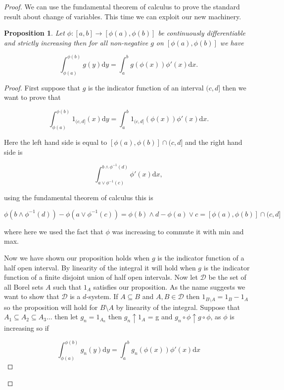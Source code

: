 \documentclass[
]{book}
\newtheorem{proposition}{Proposition}[chapter]
\theoremstyle{definition}
\theoremstyle{definition}
\theoremstyle{definition}
\theoremstyle{definition}
\theoremstyle{remark}
\begin{document}
\begin{proof}
We can use the fundamental theorem of calculus to prove the standard result about change of variables. This time we can exploit our new machinery.

\begin{proposition}
Let \(\phi: [a,b] \rightarrow [\phi(a), \phi(b)]\) be continuously differentiable and strictly increasing then for all non-negative \(g\) on \([\phi(a), \phi(b)]\) we have

\[ \int_{\phi(a)}^{\phi(b)}g(y) \mathrm{d}y = \int_a^b g(\phi(x)) \phi'(x) \mathrm{d}x. \]
\end{proposition}

\begin{proof}
First suppose that \(g\) is the indicator function of an interval \((c,d]\) then we want to prove that

\[ \int_{\phi(a)}^{\phi(b)} 1_{(c,d]}(x) \mathrm{d}y = \int_a^b  1_{(c,d]}(\phi(x)) \phi'(x) \mathrm{d}x.\]

Here the left hand side is equal to \([\phi(a), \phi(b)] \cap (c,d]\) and the right hand side is

\[ \int_{a \vee \phi^{-1}(c)}^{b \wedge \phi^{-1}(d)} \phi'(x) \mathrm{d}x,\]

using the fundamental theorem of calculus this is

\[ \phi(b \wedge \phi^{-1}(d)) - \phi(a \vee \phi^{-1}(c)) = \phi(b) \wedge d - \phi(a) \vee c = [\phi(a), \phi(b)] \cap (c,d] \]

where here we used the fact that \(\phi\) was increasing to commute it with min and max.

Now we have shown our proposition holds when \(g\) is the indicator function of a half open interval. By linearity of the integral it will hold when \(g\) is the indicator function of a finite disjoint union of half open intervals. Now let \(\mathcal{D}\) be the set of all Borel sets \(A\) such that \(1_A\) satisfies our proposition. As the name suggests we want to show that \(\mathcal{D}\) is a \(d\)-system. If \(A \subseteq B\) and \(A, B \in \mathcal{D}\) then \(1_{B \setminus A} = 1_B - 1_A\) so the proposition will hold for \(B \setminus A\) by linearity of the integral. Suppose that \(A_1 \subseteq A_2 \subseteq A_3 \dots\) then let \(g_n=1_{A_n}\) then \(g_n \uparrow 1_A\) = g and \(g_n \circ \phi \uparrow g \circ \phi\), as \(\phi\) is increasing so if

\[ \int_{\phi(a)}^{\phi(b)}g_n(y) \mathrm{d}y = \int_a^b g_n(\phi(x)) \phi'(x) \mathrm{d}x \]


\end{proof}
\end{proof}
\end{document}
